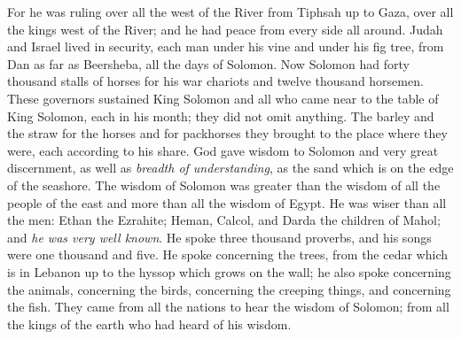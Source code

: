 \begin{biblechapter}
\verse For he was ruling over all the west of the River from Tiphsah up to Gaza, over all the kings west of the River; and he had peace from every side all around.
\verse Judah and Israel lived in security, each man under his vine and under his fig tree, from Dan as far as Beersheba, all the days of Solomon.
\verse Now Solomon had forty thousand stalls of horses for his war chariots and twelve thousand horsemen.
\verse These governors sustained King Solomon and all who came near to the table of King Solomon, each in his month; they did not omit anything.
\verse The barley and the straw for the horses and for packhorses they brought to the place where they were, each according to his share.
 God gave wisdom to Solomon and very great discernment, as well as \textit{breadth of understanding}, as the sand which is on the edge of the seashore.
\verse The wisdom of Solomon was greater than the wisdom of all the people of the east and more than all the wisdom of Egypt.
\verse He was wiser than all the men: Ethan the Ezrahite; Heman, Calcol, and Darda the children of Mahol; and \textit{he was very well known}.
\verse He spoke three thousand proverbs, and his songs were one thousand and five.
\verse He spoke concerning the trees, from the cedar which is in Lebanon up to the hyssop which grows on the wall; he also spoke concerning the animals, concerning the birds, concerning the creeping things, and concerning the fish.
\verse They came from all the nations to hear the wisdom of Solomon; from all the kings of the earth who had heard of his wisdom.
\end{biblechapter}

